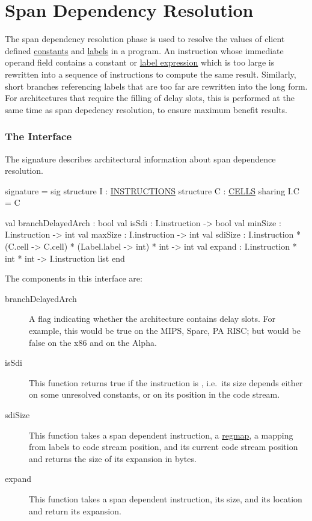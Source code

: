 \section{Span Dependency Resolution} \label{sec:span-dep}

The span dependency resolution phase is used to resolve the values of
client defined \href{constants.html}{constants} and \href{labels.html}{labels}
in a program.  An instruction whose immediate operand field contains a
constant or \href{labexp.html}{label expression} which
is too large is rewritten into a sequence of instructions to compute
the same result.  Similarly, short branches referencing labels that are 
too far are rewritten into the long form.   For architectures
that require the filling of delay slots, this is performed at the same
time as span depedency resolution, to ensure maximum benefit results.

\subsubsection{The Interface}

The signature  describes
architectural information about span dependence resolution.

\begin{SML}
signature  = sig
  structure I : \href{instructions.html}{INSTRUCTIONS}
  structure C : \href{cells.html}{CELLS}
    sharing I.C = C

  val branchDelayedArch : bool
  val isSdi : I.instruction -> bool
  val minSize : I.instruction -> int
  val maxSize : I.instruction -> int
  val sdiSize : I.instruction * (C.cell -> C.cell)
                              * (Label.label -> int) * int -> int
  val expand : I.instruction * int * int -> I.instruction list
end
\end{SML}

The components in this interface are:
\begin{description}
  \item[branchDelayedArch] A flag indicating whether the architecture
contains delay slots.  For example, this would be true on the MIPS,
Sparc, PA RISC; but would be false on the x86 and on the Alpha.
   \item[isSdi] This function returns true if the instruction is 
, i.e.~its size depends either on some unresolved
constants, or on its position in the code stream.
   \item[sdiSize]  This function takes a span dependent instruction, 
a \href{regmap.html}{regmap},
a mapping from labels to code stream position, and 
its current code stream position and returns the size of its
expansion in bytes.
   \item[expand] This function takes a span dependent instruction,
its size, and its location and return its expansion.
\end{description}

